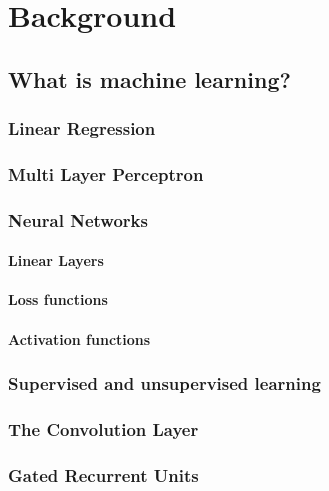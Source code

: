 \chapter{Background}

\section{What is machine learning?}


\subsection{Linear Regression}

\subsection{Multi Layer Perceptron}

\subsection{Neural Networks}

\subsubsection{Linear Layers}

\subsubsection{Loss functions}

\subsubsection{Activation functions}

\subsection{Supervised and unsupervised learning}

\subsection{The Convolution Layer}

\subsection{Gated Recurrent Units}